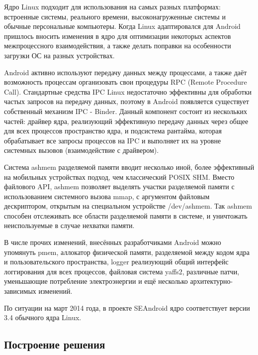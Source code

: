 Ядро Linux подходит для использования на самых разных платформах:
встроенные системы, реального времени, высоконагруженные системы и
обычные персональные компьютеры. Когда Linux адаптировался для Android
пришлось вносить изменения в ядро для оптимизации некоторых аспектов
межпроцессного взаимодействия, а также делать поправки на особенности
загрузки ОС на разных устройствах.

Android активно используют передачу данных между процессами, а также
даёт возможность процессам организовать свои процедуры RPC (Remote
Procedure Call). Стандартные средства IPC Linux недостаточно эффективны
для обработки частых запросов на передачу данных, поэтому в Android
появляется существует собственный механизм IPC - Binder. Данный
компонент состоит из нескольких частей: драйвер ядра, реализующий
эффективную передачу данных через общее для всех процессов пространство
ядра, и подсистема рантайма, которая обрабатывает все запросы процессов
на IPC и выполняет их на уровне системных вызовов (взаимодействие с
драйвером).

Система ashmem разделяемой памяти вводит несколько иной, более
эффективный на мобильных устройствах подход, чем классический POSIX SHM.
Вместо файлового API, ashmem позволяет выделять участки разделяемой
памяти с использованием системного вызова mmap, с аргументом файловым
дескриптором, открытым на специальном устройстве /dev/ashmem. Так ashmem
способен отслеживать все области разделяемой памяти в системе, и
уничтожать неиспользуемые в случае нехватки памяти.

В числе прочих изменений, внесённых разработчиками Android можно
упомянуть pmem, аллокатор физической памяти, разделяемой между кодом
ядра и пользовательского пространства, logger реализующий общий
интерфейс логгирования для всех процессов, файловая система yaffs2,
различные патчи, уменьшающие потребление электроэнергии и ещё несколько
архитектурно-зависимых изменений.

По ситуации на март 2014 года, в проекте SEAndroid ядро соответствует 
версии 3.4 обычного ядра Linux.

\subsection{Построение решения}

